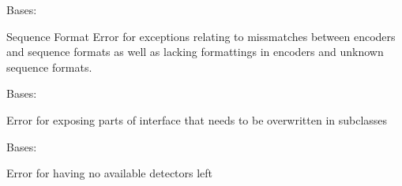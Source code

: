 \documentclass[letterpaper,10pt,english]{sphinxmanual}
\begin{document}

\begin{fulllineitems}
\label{fseq.reading:fseq.reading.seq_encoder.FormatError}
Bases: 

Sequence Format Error for exceptions relating to missmatches between
encoders and sequence formats as well as lacking formattings in encoders
and unknown sequence formats.

\end{fulllineitems}


\begin{fulllineitems}
\label{fseq.reading:fseq.reading.seq_encoder.FormatImplementationError}
Bases: {\hyperref[fseq.reading:fseq.reading.seq_encoder.FormatError]{}}

Error for exposing parts of interface that needs to be overwritten
in subclasses

\end{fulllineitems}


\begin{fulllineitems}
\label{fseq.reading:fseq.reading.seq_encoder.FormatUnknown}
Bases: {\hyperref[fseq.reading:fseq.reading.seq_encoder.FormatError]{}}

Error for having no available detectors left

\end{fulllineitems}

\end{document}

